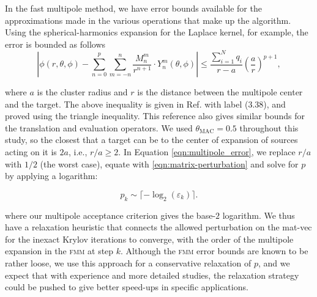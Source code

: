 \documentclass[smallcondensed,final]{svjour3}
\newcommand{\fmm}{\textsc{fmm}\xspace}
\begin{document}
In the fast multipole method, we have error bounds available for the approximations made in the various operations that make up the algorithm. Using the spherical-harmonics expansion for the Laplace kernel, for example, the error is bounded as follows 
%
\begin{equation}\label{eqn:multipole_error}
	\left | \phi(r, \theta, \phi) - \sum_{n=0}^{p}\sum_{m=-n}^{n}\frac{M^{m}_{n}}{r^{n+1}}\cdot Y^{m}_{n}(\theta, \phi) \right | \leq \frac{\sum_{i=1}^{N}q_{i}}{r-a}\left ( \frac{a}{r} \right )^{p+1},
\end{equation}

\noindent where $a$ is the  cluster radius and $r$ is the distance between the multipole center and the target. The above inequality is given in Ref. \cite[p.~55]{greengard1987} with label (3.38), and proved using the triangle inequality. This reference also gives similar bounds for the translation and evaluation operators. We used $\theta_{\text{MAC}} = 0.5$ throughout this study, so the closest that a target can be to the center of expansion of sources acting on it is $2a$, i.e., $r/a \geq 2$. In Equation \eqref{eqn:multipole_error}, we replace $r/a$ with $1/2$ (the worst case), equate with \eqref{eqn:matrix-perturbation} and solve for $p$ by applying a logarithm:

\begin{equation}\label{eqn:fmm_p}
	p_k \sim \lceil -\log_{2}(\varepsilon_k) \rceil.
\end{equation}

\noindent where our multipole acceptance criterion gives the base-$2$ logarithm. We thus have a relaxation heuristic that connects the allowed perturbation on the mat-vec for the inexact Krylov iterations to converge, with the order of the multipole expansion in the \fmm at step $k$.
Although the \fmm error bounds are known to be rather loose, we use this approach for a conservative relaxation of $p$, and we expect that with experience and more detailed studies, the relaxation strategy could be pushed to give better speed-ups in specific applications.


\end{document}
